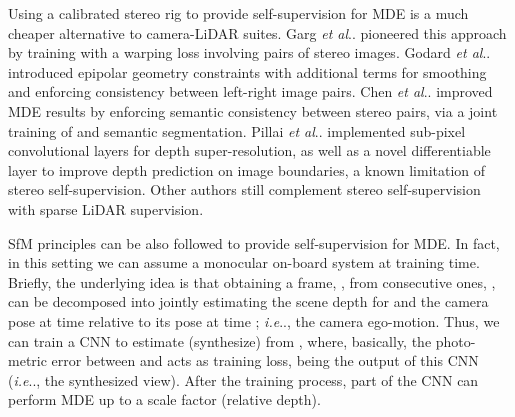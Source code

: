 \documentclass[journal]{IEEEtran}
\makeatletter
\DeclareRobustCommand\onedot{\futurelet\@let@token\@onedot}
\def\@onedot{\ifx\@let@token.\else.\null\fi\xspace}
\def\ie{\emph{i.e}\onedot} \def\Ie{\emph{I.e}\onedot}
\def\etal{\emph{et al}\onedot}
\makeatother
\begin{document}
Using a calibrated stereo rig to provide self-supervision for MDE is a much cheaper alternative to camera-LiDAR suites. Garg {\etal} \cite{Garg:2016} pioneered this approach by training  with a warping loss involving pairs of stereo images. 
Godard {\etal} \cite{Godard:2017} introduced epipolar geometry constraints with additional terms for smoothing and enforcing consistency between left-right image pairs.
Chen {\etal} \cite{Chen:2019} improved MDE results by enforcing semantic consistency between stereo pairs, via a joint training of  and semantic segmentation.
Pillai {\etal} \cite{Pillai:2019} implemented sub-pixel convolutional layers for depth super-resolution, as well as a novel differentiable layer to improve depth prediction on image boundaries, a known limitation of stereo self-supervision. 
Other authors \cite{Kuznietsov:2017, He:2018wearable} still complement stereo self-supervision with sparse LiDAR supervision.

SfM principles \cite{Ozyesil:2017} can be also followed to provide self-supervision for MDE. In fact, in this setting we can assume a monocular on-board system at training time. Briefly, the underlying idea is that obtaining a frame, , from consecutive ones, , can be decomposed into jointly estimating the scene depth for  and the camera pose at time  relative to its pose at time ; {\ie}, the camera ego-motion. Thus, we can train a CNN to estimate (synthesize)  from , where, basically, the photo-metric error between  and  acts as training loss, being  the output of this CNN ({\ie}, the synthesized view). After the training process, part of the CNN can perform MDE up to a scale factor (relative depth).
\end{document}
